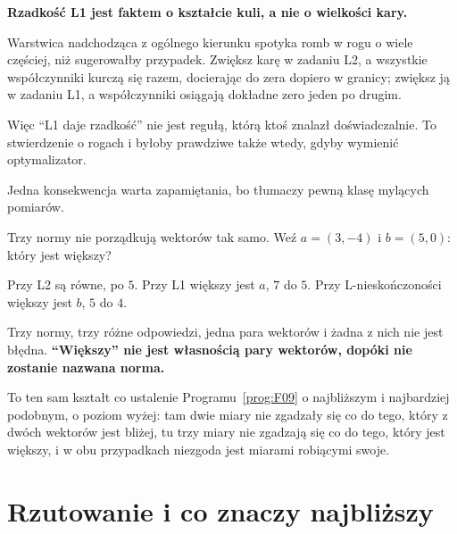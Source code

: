 \begin{fr}
\begin{trapbox}
\textbf{Rzadkość L1 jest faktem o kształcie kuli, a nie o wielkości kary.}

Warstwica nadchodząca z ogólnego kierunku spotyka romb w rogu o wiele częściej,
niż sugerowałby przypadek. Zwiększ karę w zadaniu L2, a wszystkie
współczynniki kurczą się razem, docierając do zera dopiero w granicy; zwiększ
ją w zadaniu L1, a współczynniki osiągają dokładne zero jeden po drugim.

Więc \enquote{L1 daje rzadkość} nie jest regułą, którą ktoś znalazł
doświadczalnie. To stwierdzenie o rogach i byłoby prawdziwe także wtedy, gdyby
wymienić optymalizator.
\end{trapbox}
\end{fr}

\begin{fr}
Jedna konsekwencja warta zapamiętania, bo tłumaczy pewną klasę mylących
pomiarów.

Trzy normy nie porządkują wektorów tak samo. Weź $a = (3, -4)$ i
$b = (5, 0)$: który jest większy?
\dotline
\nextframe
\end{fr}

\begin{fr}
\begin{ansblock}
Przy L2 są równe, po $5$. Przy L1 większy jest $a$, $7$ do $5$. Przy
L-nieskończoności większy jest $b$, $5$ do $4$.
\end{ansblock}

Trzy normy, trzy różne odpowiedzi, jedna para wektorów i żadna z nich nie jest
błędna. \textbf{\enquote{Większy} nie jest własnością pary wektorów, dopóki nie
zostanie nazwana norma.}

To ten sam kształt co ustalenie Programu~\ref{prog:F09} o najbliższym i
najbardziej podobnym, o poziom wyżej: tam dwie miary nie zgadzały się co do
tego, który z dwóch wektorów jest bliżej, tu trzy miary nie zgadzają się co do
tego, który jest większy, i w obu przypadkach niezgoda jest miarami robiącymi
swoje.
\end{fr}

\section{Rzutowanie i co znaczy najbliższy}
\label{sec:P05-projection}

